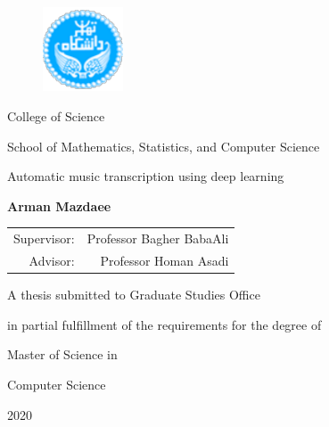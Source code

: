 \begin{latin}

\begin{figure}
    \centering
    \includegraphics[height=2.5cm]{./statics/UT-Logo.pdf}
\end{figure}

\begin{center}
    College of Science

    School of Mathematics, Statistics, and Computer Science
\end{center}

\vspace{1cm}

\begin{center}
\huge{Automatic music transcription using deep learning}
\end{center}

\vspace{1cm}

\begin{center}
    \textbf{Arman Mazdaee}
\end{center}

\begin{center}
    \begin{tabular}{rr}
        Supervisor: & Professor Bagher BabaAli
        \\
        Advisor: & Professor Homan Asadi
    \end{tabular}
\end{center}

\vspace{3cm}

\begin{center}
    A thesis submitted to Graduate Studies Office

    in partial fulfillment of the requirements for the degree of

    Master of Science in

    Computer Science
\end{center}

\begin{center}
    2020
\end{center}

\end{latin}

\pagestyle{empty}
\pagenumbering{}